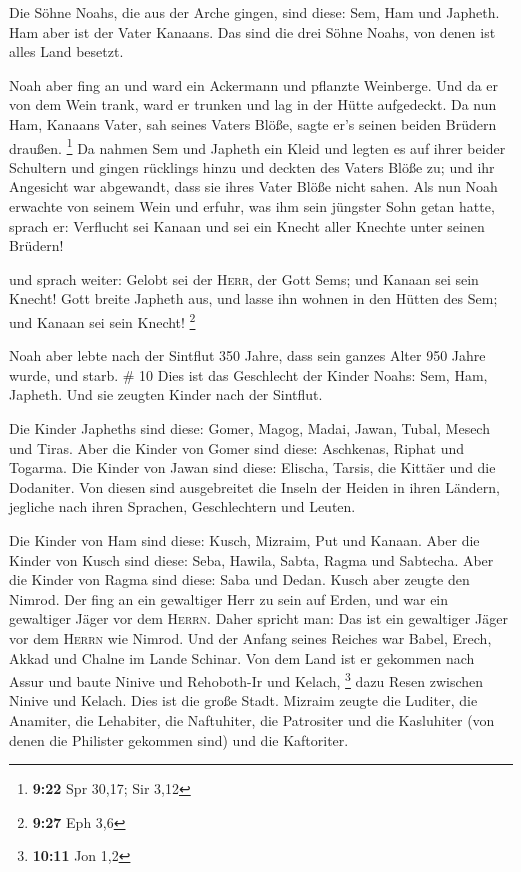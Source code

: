  Die Söhne Noahs, die aus der Arche gingen, sind diese:
Sem, Ham und Japheth. Ham aber ist der Vater Kanaans. 
Das sind die drei Söhne Noahs, von denen ist alles Land besetzt.

 Noah aber fing an und ward ein Ackermann und pflanzte
Weinberge.  Und da er von dem Wein trank, ward er trunken
und lag in der Hütte aufgedeckt.  Da nun Ham, Kanaans
Vater, sah seines Vaters Blöße, sagte er's seinen beiden Brüdern
draußen. \footnote{\textbf{9:22} Spr 30,17; Sir 3,12}  Da
nahmen Sem und Japheth ein Kleid und legten es auf ihrer beider
Schultern und gingen rücklings hinzu und deckten des Vaters Blöße zu;
und ihr Angesicht war abgewandt, dass sie ihres Vater Blöße nicht sahen.
 Als nun Noah erwachte von seinem Wein und erfuhr, was
ihm sein jüngster Sohn getan hatte,  sprach er: Verflucht
sei Kanaan und sei ein Knecht aller Knechte unter seinen Brüdern!

 und sprach weiter: Gelobt sei der \textsc{Herr}, der
Gott Sems; und Kanaan sei sein Knecht!  Gott breite
Japheth aus, und lasse ihn wohnen in den Hütten des Sem; und Kanaan sei
sein Knecht! \footnote{\textbf{9:27} Eph 3,6}

 Noah aber lebte nach der Sintflut 350 Jahre,
 dass sein ganzes Alter 950 Jahre wurde, und starb. \# 10
 Dies ist das Geschlecht der Kinder Noahs: Sem, Ham,
Japheth. Und sie zeugten Kinder nach der Sintflut.

 Die Kinder Japheths sind diese: Gomer, Magog, Madai,
Jawan, Tubal, Mesech und Tiras.  Aber die Kinder von Gomer
sind diese: Aschkenas, Riphat und Togarma.  Die Kinder von
Jawan sind diese: Elischa, Tarsis, die Kittäer und die Dodaniter.
 Von diesen sind ausgebreitet die Inseln der Heiden in
ihren Ländern, jegliche nach ihren Sprachen, Geschlechtern und Leuten.

 Die Kinder von Ham sind diese: Kusch, Mizraim, Put und
Kanaan.  Aber die Kinder von Kusch sind diese: Seba,
Hawila, Sabta, Ragma und Sabtecha. Aber die Kinder von Ragma sind diese:
Saba und Dedan.  Kusch aber zeugte den Nimrod. Der fing an
ein gewaltiger Herr zu sein auf Erden,  und war ein
gewaltiger Jäger vor dem \textsc{Herrn}. Daher spricht man: Das ist ein
gewaltiger Jäger vor dem \textsc{Herrn} wie Nimrod.  Und
der Anfang seines Reiches war Babel, Erech, Akkad und Chalne im Lande
Schinar.  Von dem Land ist er gekommen nach Assur und
baute Ninive und Rehoboth-Ir und Kelach, \footnote{\textbf{10:11} Jon
  1,2}  dazu Resen zwischen Ninive und Kelach. Dies ist
die große Stadt.  Mizraim zeugte die Luditer, die
Anamiter, die Lehabiter, die Naftuhiter,  die Patrositer
und die Kasluhiter (von denen die Philister gekommen sind) und die
Kaftoriter.

